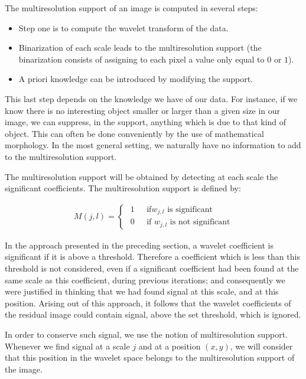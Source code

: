 \documentclass[11pt,a4paper]{article}
\begin{document}
The multiresolution support of an image is computed in several steps:
\begin{itemize}
\item Step one is to compute the wavelet transform of the data.
\item Binarization of each scale leads to the multiresolution support
(the binarization consists of assigning to each pixel a value 
only equal to $0$ or $1$). 
\item A priori knowledge can be introduced by modifying the support.
\end{itemize}
This last step depends on the knowledge we have of our data.
For instance, if we know there is no interesting object smaller or 
larger 
than a
given size in our image, we can suppress, in the support, anything 
which is
due to that kind of object. This can often be done conveniently by  the 
use of 
mathematical morphology. In the most general setting, we naturally have
no information to add to the multiresolution support.

The multiresolution support will be obtained by detecting 
at each scale the significant coefficients. 
The multiresolution support is defined by:
 
\begin{eqnarray} M(j,l) = \left\{ \begin{array}{ll} \mbox{ 1 } & 
\mbox{ if
}   w_{j,l} \mbox{ is significant} \\ \mbox{ 0 } & \mbox{ if }  
w_{j,l}
\mbox{ is not significant} \end{array} \right. 
\end{eqnarray} 



In the approach presented in the preceding section, 
a wavelet coefficient is significant
if it is above a threshold.  Therefore a coefficient which is 
less than this threshold is not considered, even if a significant 
coefficient had
been found at the same scale as this coefficient, during previous 
iterations; and consequently we were justified in thinking that we had found
signal at this scale, and at this position.  Arising out of this approach,
it follows that the wavelet coefficients of the residual image could
contain signal, above the set threshold, which is ignored.  
 
In order to 
conserve such signal, we use the notion of multiresolution support.
Whenever we find signal at a scale $j$ and at a position $(x,y)$, we will 
consider that this position in the wavelet space belongs to the 
multiresolution support of the image.
 
\end{document}
